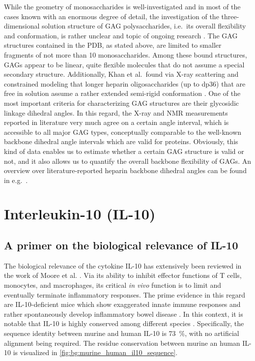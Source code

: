 While the geometry of monosaccharides is well-investigated and in most of the
cases known with an enormous degree of detail, the investigation of the
three-dimensional solution structure of GAG polysaccharides, i.e.\ its overall
flexibility and conformation, is rather unclear and topic of ongoing research
\cite{structure_gags_progess_perspectives_2010}. The GAG structures contained in
the PDB, as stated above, are limited to smaller fragments of not more than 10
monosaccharides. Among these bound structures, GAGs appear to be linear, quite
flexible molecules that do not assume a special secondary structure.
Additionally, Khan et al.\ found via X-ray scattering and constrained modeling
that longer heparin oligosaccharides (up to dp36) that are free in solution
assume a rather extended semi-rigid conformation
\cite{semi_rigid_heparin_structures_2010}. One of the most important criteria
for characterizing GAG structures are their glycosidic linkage dihedral angles.
In this regard, the X-ray and NMR measurements reported in literature very much
agree on a certain angle interval, which is accessible to all major GAG types,
conceptually comparable to the well-known backbone dihedral angle intervals
which are valid for proteins. Obviously, this kind of data enables us to
estimate whether a certain GAG structure is valid or not, and it also allows us
to quantify the overall backbone flexibility of GAGs. An overview over
literature-reported heparin backbone dihedral angles can be found in e.g.\
\cite{semi_rigid_heparin_structures_2010}.


\section{Interleukin-10 (IL-10)}

\subsection{A primer on the biological relevance of IL-10}
\label{background:il10biologyprimer}

The biological relevance of the cytokine IL-10 has extensively been reviewed in
the work of Moore et al. \cite{moore_2001}. Via its ability to inhibit effector
functions of T cells, monocytes, and macrophages, its critical
\textit{in vivo} function is to limit and eventually terminate inflammatory
responses. The prime evidence in this regard are IL-10-deficient mice which show
exaggerated innate immune responses and rather spontaneously develop
inflammatory bowel disease \cite{mueller_il10defmouse_1993,
roers_il10_mice_2004,rubtsov_il10_mice_2008}. In this context, it is notable
that IL-10 is highly conserved among different species
\cite{il10_dna_rabiit_2000, porcine_il10_1995}. Specifically, the sequence
identity between murine and human IL-10 is \SI{73}{\percent}, with no artificial
alignment being required. The residue conservation between murine an human IL-10
is visualized in
\cref{fig:bg:murine_human_il10_sequence}.

